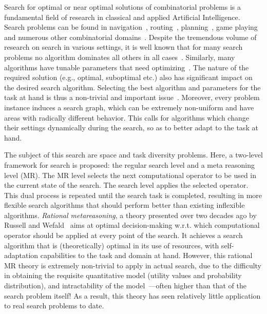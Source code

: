 Search for optimal or near optimal solutions of combinatorial problems
is a fundamental field of research in classical and applied Artificial
Intelligence. Search problems can be found in
navigation~\cite{Kocsis.uct}, routing~\cite{Bellman.routing},
planning~\cite{Domshlak.maxornot}, game
playing \cite{Braudis.pachi,Good.chess} and numerous other
combinatorial domains~\cite{Korf.partitioning}.  Despite the
tremendous volume of research on search in various settings, it is
well known that for many search problems no algorithm dominates all
others in all cases~\cite{Wolpert.nofree}. Similarly, many algorithms
have tunable parameters that need
optimizing~\cite{Hutter.spo,TolpinShimony.raticomp}. The nature of the
required solution (e.g., optimal, suboptimal etc.) also has
significant impact on the desired search algorithm. Selecting the best
algorithm and parameters for the task at hand is thus a non-trivial
and important issue~\cite{Allen.selheur,Gomes.portfolio}. Moreover,
every problem instance induces a search graph, which can be extremely
non-uniform and have areas with radically different behavior. This
calls for algorithms which change their settings dynamically during
the search, so as to better adapt to the task at hand.

The subject of this search are space and task diversity problems.
Here, a two-level framework for search is proposed: the regular search
level and a meta reasoning level (MR). The MR level selects the next
computational operator to be used in the current state of the
search. The search level applies the selected operator. This dual
process is repeated until the search task is completed, resulting in
more flexible search algorithms that should perform better than
existing inflexible algorithms.  \textit{Rational metareasoning}, a
theory presented over two decades ago by Russell and
Wefald~\cite{Russell.right} aims at optimal decision-making
w.r.t. which computational operator should be applied at every point
of the search. It achieves a search algorithm that is (theoretically)
optimal in its use of resources, with self-adaptation capabilities to
the task and domain at hand. However, this rational MR theory is
extremely non-trivial to apply in actual search, due to the difficulty
in obtaining the requisite quantitative model (utility values and
probability distribution), and intractability of the
model~\cite{Conitzer.complexity}---often higher than that of the
search problem itself!  As a result, this theory has seen relatively
little application to real search problems to date.

